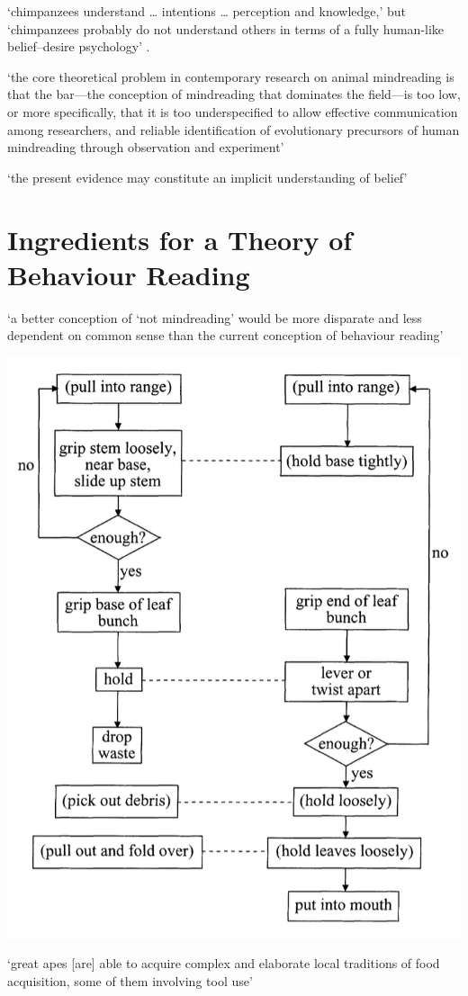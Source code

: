\documentclass[12pt]{extarticle}
\begin{document}
\begin{multicols*}{3}
‘chimpanzees understand … intentions … perception and knowledge,’ but ‘chimpanzees probably do not
understand others in terms of a fully human-like belief–desire psychology’
\citet[p.~191]{Call:2008di}.

‘the core theoretical problem in contemporary research on animal mindreading is that the bar—the
conception of mindreading that dominates the field—is too low, or more specifically, that it is
too underspecified to allow effective communication among researchers, and reliable
identification of evolutionary precursors of human mindreading through observation and experiment’
\citep[p.~318]{heyes:2014_animal}

‘the present evidence may constitute an implicit understanding of belief’
\citep[p.~113]{krupenye:2016_great}



\section{Ingredients for a Theory of Behaviour Reading}

‘a better conception of ‘not mindreading’ would be more disparate and
less dependent on common sense than the current conception of behaviour reading’
\citep[p.~322]{heyes:2014_animal}

\begin{center}
\includegraphics[scale=0.3]{img/byrne_2003_fig1.png}
\end{center}
‘great apes [are] able to acquire complex and elaborate local traditions of food
acquisition, some of them involving tool use’ \citep[p~513]{Byrne:2003wx}


\end{multicols*}
\end{document}
